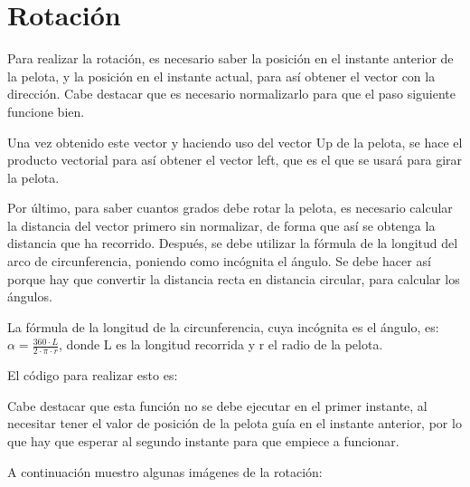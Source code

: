 \section{Rotación}

Para realizar la rotación, es necesario saber la posición en el instante anterior de la pelota, y la posición en el instante actual, para así obtener el vector con la dirección. Cabe destacar que es necesario normalizarlo para que el paso siguiente funcione bien.

\bigskip

Una vez obtenido este vector y haciendo uso del vector Up de la pelota, se hace el producto vectorial para así obtener el vector left, que es el que se usará para girar la pelota.

\bigskip

Por último, para saber cuantos grados debe rotar la pelota, es necesario calcular la distancia del vector primero sin normalizar, de forma que así se obtenga la distancia que ha recorrido. Después, se debe utilizar la fórmula de la longitud del arco de circunferencia, poniendo como incógnita el ángulo. Se debe hacer así porque hay que convertir la distancia recta en distancia circular, para calcular los ángulos. 

\bigskip

La fórmula de la longitud de la circunferencia, cuya incógnita es el ángulo, es: $\alpha = \frac{360 \cdot L}{2 \cdot \pi \cdot r} $, donde L es la longitud recorrida y r el radio de la pelota.

\bigskip

El código para realizar esto es:



Cabe destacar que esta función no se debe ejecutar en el primer instante, al necesitar tener el valor de posición de la pelota guía en el instante anterior, por lo que hay que esperar al segundo instante para que empiece a funcionar.

\bigskip

A continuación muestro algunas imágenes de la rotación:

